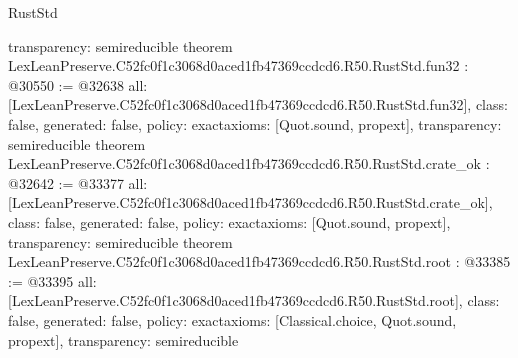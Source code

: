 \begin{lexlean}{RustStd}
\begin{coremodule}
{  transparency: semireducible
}
theorem LexLeanPreserve.C52fc0f1c3068d0aced1fb47369ccdcd6.R50.RustStd.fun32 : @30550 := @32638 {
  all: [LexLeanPreserve.C52fc0f1c3068d0aced1fb47369ccdcd6.R50.RustStd.fun32],
  class: false,
  generated: false,
  policy: exact{axioms: [Quot.sound, propext]},
  transparency: semireducible
}
theorem LexLeanPreserve.C52fc0f1c3068d0aced1fb47369ccdcd6.R50.RustStd.crate_ok : @32642 := @33377 {
  all: [LexLeanPreserve.C52fc0f1c3068d0aced1fb47369ccdcd6.R50.RustStd.crate_ok],
  class: false,
  generated: false,
  policy: exact{axioms: [Quot.sound, propext]},
  transparency: semireducible
}
theorem LexLeanPreserve.C52fc0f1c3068d0aced1fb47369ccdcd6.R50.RustStd.root : @33385 := @33395 {
  all: [LexLeanPreserve.C52fc0f1c3068d0aced1fb47369ccdcd6.R50.RustStd.root],
  class: false,
  generated: false,
  policy: exact{axioms: [Classical.choice, Quot.sound, propext]},
  transparency: semireducible
}


\end{coremodule}
\end{lexlean}
